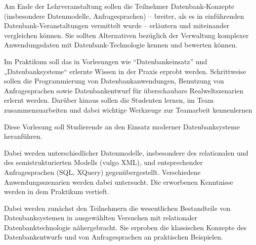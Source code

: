 \begin{module}
\begin{learningoutcomes}
Am Ende der Lehrveranstaltung sollen die Teilnehmer Datenbank-Konzepte (insbesondere Datenmodelle, Anfragesprachen) – breiter, als es in einführenden Datenbank-Veranstaltungen vermittelt wurde – erläutern und miteinander vergleichen können. Sie sollten Alternativen bezüglich der Verwaltung komplexer Anwendungsdaten mit Datenbank-Technologie kennen und bewerten können.

 

Im Praktikum soll das in Vorlesungen wie “Datenbankeinsatz” und „Datenbanksysteme“ erlernte Wissen in der Praxis erprobt werden. Schrittweise sollen die Programmierung von Datenbankanwendungen, Benutzung von Anfragesprachen sowie Datenbankentwurf für überschaubare Realweltszenarien erlernt werden. Darüber hinaus sollen die Studenten lernen, im Team zusammenzuarbeiten und dabei wichtige Werkzeuge zur Teamarbeit kennenlernen


\end{learningoutcomes}

\begin{content}
Diese Vorlesung soll Studierende an den Einsatz moderner Datenbanksysteme heranführen.

 

Dabei werden unterschiedlicher Datenmodelle, insbesondere des relationalen und des semistrukturierten Modells (vulgo XML), und entsprechender Anfragesprachen (SQL, XQuery) gegenübergestellt. Verschiedene Anwendungsszenarien werden dabei untersucht. Die erworbenen Kenntnisse werden in dem Praktikum vertieft.

 

Dabei werden zunächst den Teilnehmern die wesentlichen Bestandteile von Datenbanksystemen in ausgewählten Versuchen mit relationaler Datenbanktechnologie nähergebracht. Sie erproben die klassischen Konzepte des Datenbankentwurfs und von Anfragesprachen an praktischen Beispielen.


\end{content}



\end{module}

